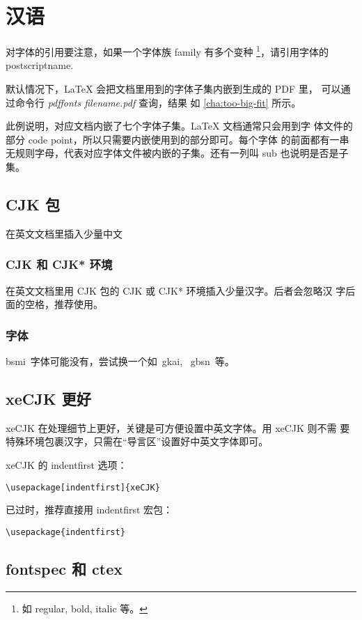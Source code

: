 \chapter{汉语}
\label{cha:inputChinese}

对字体的引用要注意，如果一个字体族 family 有多个变种 \footnote{如
  regular, bold, italic 等。}，请引用字体的 postscriptname.

默认情况下，\LaTeX{} 会把文档里用到的字体子集内嵌到生成的 PDF 里，
可以通过命令行 \textit{pdffonts filename.pdf} 查询，结果
如 \ref{cha:too-big-fit} 所示。

此例说明，对应文档内嵌了七个字体子集。\LaTeX{} 文档通常只会用到字
体文件的部分 code point，所以只需要内嵌使用到的部分即可。每个字体
的前面都有一串无规则字母，代表对应字体文件被内嵌的子集。还有一列叫
sub 也说明是否是子集。

\section{CJK 包}

在英文文档里插入少量中文

\subsection{CJK 和 CJK* 环境}
在英文文档里用 CJK 包的 CJK 或 CJK* 环境插入少量汉字。后者会忽略汉
字后面的空格，推荐使用。

\subsection{字体}
bsmi~字体可能没有，尝试换一个如~gkai, ~gbsn~等。

\section{xeCJK 更好}
xeCJK 在处理细节上更好，关键是可方便设置中英文字体。用 xeCJK 则不需
要特殊环境包裹汉字，只需在``导言区''设置好中英文字体即可。

xeCJK 的 indentfirst 选项：
\begin{center}
  \verb|\usepackage[indentfirst]{xeCJK}|
\end{center}
已过时，推荐直接用 indentfirst 宏包：
\begin{center}
  \verb|\usepackage{indentfirst}|
\end{center}

\section{fontspec 和 ctex}
\label{sec:fontspec-ctex}


